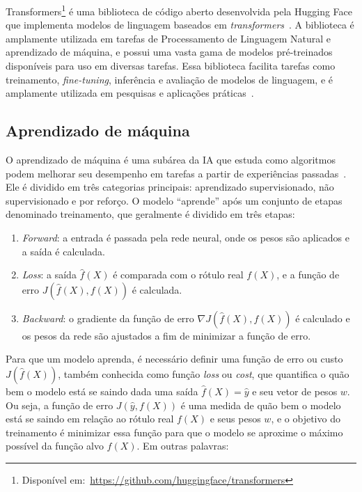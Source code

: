 \documentclass[journal]{IEEEtran}
\begin{document}
Transformers\footnote{Disponível em:~\url{https://github.com/huggingface/transformers}} é uma biblioteca de código aberto desenvolvida pela Hugging Face que implementa modelos de linguagem baseados em \textit{transformers}~\cite{vaswani2017attention,wolf-etal-2020-transformers}.
A biblioteca é amplamente utilizada em tarefas de Processamento de Linguagem Natural e aprendizado de máquina, e possui uma vasta gama de modelos pré-treinados disponíveis para uso em diversas tarefas.
Essa biblioteca facilita tarefas como treinamento, \textit{fine-tuning}, inferência e avaliação de modelos de linguagem, e é amplamente utilizada em pesquisas e aplicações práticas~\cite{wolf-etal-2020-transformers}.

\subsection{Aprendizado de máquina}

\noindent%
O aprendizado de máquina é uma subárea da IA que estuda como algoritmos podem melhorar seu desempenho em tarefas a partir de experiências passadas~\cite{manning2020aidefinitions,russell2016artificial}.
Ele é dividido em três categorias principais: aprendizado supervisionado, não supervisionado e por reforço.
O modelo ``aprende'' após um conjunto de etapas denominado treinamento, que geralmente é dividido em três etapas:

\begin{enumerate}
    \item \textit{Forward}: a entrada é passada pela rede neural, onde os pesos são aplicados e a saída é calculada.
    \item \textit{Loss}: a saída $\hat{f}(X)$ é comparada com o rótulo real $f(X)$, e a função de erro $J(\hat{f}(X), f(X))$ é calculada.
    \item \textit{Backward}: o gradiente da função de erro $\nabla J(\hat{f}(X), f(X))$ é calculado e os pesos da rede são ajustados a fim de minimizar a função de erro.
\end{enumerate}

Para que um modelo aprenda, é necessário definir uma função de erro ou custo $J(\hat{f}(X))$, também conhecida como função \textit{loss} ou \textit{cost}, que quantifica o quão bem o modelo está se saindo dada uma saída $\hat{f}(X)=\hat{y}$ e seu vetor de pesos $w$.
Ou seja, a função de erro $J(\hat{y}, f(X))$ é uma medida de quão bem o modelo está se saindo em relação ao rótulo real $f(X)$ e seus pesos $w$, e o objetivo do treinamento é minimizar essa função para que o modelo se aproxime o máximo possível da função alvo $f(X)$.
Em outras palavras:
\end{document}

